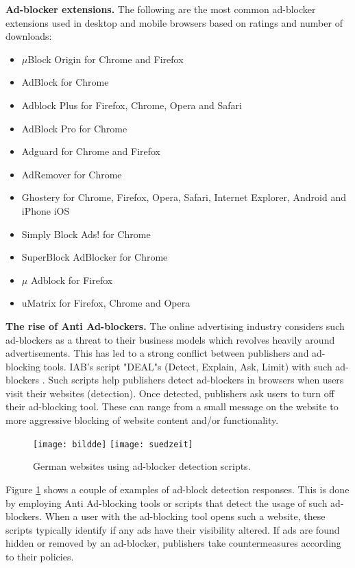 \documentclass[runningheads,a4paper]{llncs}
\begin{document}
\textbf{Ad-blocker extensions.} The following are the most common ad-blocker extensions used in desktop and mobile browsers based on ratings and number of downloads:
\begin{itemize}
\item $\mu$Block Origin for Chrome and Firefox
\item AdBlock for Chrome
\item Adblock Plus for Firefox, Chrome, Opera and Safari
\item AdBlock Pro for Chrome
\item Adguard for Chrome and Firefox
\item AdRemover for Chrome
\item Ghostery for Chrome, Firefox, Opera, Safari, Internet Explorer, Android and iPhone iOS
\item Simply Block Ads! for Chrome
\item SuperBlock AdBlocker for Chrome
\item $\mu$ Adblock for Firefox
\item uMatrix for Firefox, Chrome and Opera
\end{itemize}

\textbf{The rise of Anti Ad-blockers.} The online advertising industry considers such ad-blockers as a threat to their business models which revolves heavily around advertisements. This has led to a strong conflict between publishers and ad-blocking tools. IAB's script "DEAL"s (Detect, Explain, Ask, Limit) with such ad-blockers \cite{IAB2017}. Such scripts help publishers detect ad-blockers in browsers when users visit their websites (detection). Once detected, publishers ask
users to turn off their ad-blocking tool. These can range from a small message on the website to more aggressive blocking of website content and/or functionality. 

\begin{figure}
\centering
\texttt{[image: bildde]}
\texttt{[image: suedzeit]}
\caption{German websites using ad-blocker detection scripts.}
\label{fig:germanBlocks}
\end{figure}

Figure \ref{fig:germanBlocks} shows a couple of examples of ad-block detection responses. This is done by employing Anti Ad-blocking tools or scripts that detect the usage of such ad-blockers. When a user with the ad-blocking tool opens such a website, these scripts typically identify if any ads have their visibility altered. If ads are found hidden or removed by an ad-blocker, publishers take countermeasures according to their policies.
\end{document}
